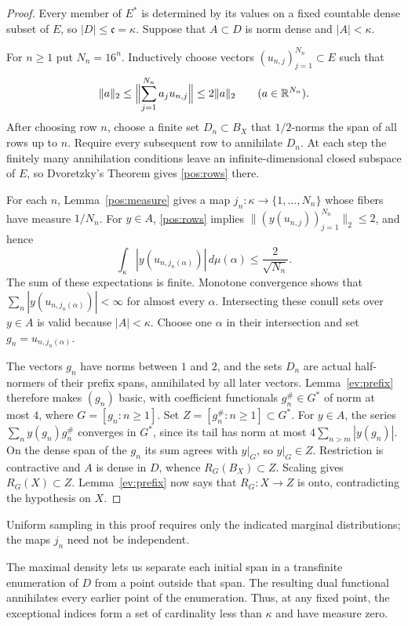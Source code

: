 \begin{proof}
Every member of $E^*$ is determined by its values on a fixed countable
dense subset of $E$, so $|D|\le\mathfrak c=\kappa$.  Suppose that $A\subset D$
is norm dense and $|A|<\kappa$.

For $n\ge1$ put $N_n=16^n$.  Inductively choose vectors
$(u_{n,j})_{j=1}^{N_n}\subset E$ such that
\begin{equation}\label{pos:rows}
 \|a\|_2\le\Bigl\|\sum_{j=1}^{N_n}a_j u_{n,j}\Bigr\|
       \le2\|a\|_2\qquad(a\in\mathbb R^{N_n}).
\end{equation}
After choosing row $n$, choose a finite set $D_n\subset B_X$ that
$1/2$-norms the span of all rows up to $n$.  Require every subsequent row
to annihilate $D_n$.  At each step the finitely many annihilation conditions
leave an infinite-dimensional closed subspace of $E$, so Dvoretzky's
Theorem gives \eqref{pos:rows} there.

For each $n$, Lemma~\ref{pos:measure} gives a map
$j_n:\kappa\to\{1,\ldots,N_n\}$ whose fibers have measure $1/N_n$.
For $y\in A$, \eqref{pos:rows} implies
$\|(y(u_{n,j}))_{j=1}^{N_n}\|_2\le2$, and hence
\[
 \int_\kappa |y(u_{n,j_n(\alpha)})|\,d\mu(\alpha)
 \le \frac2{\sqrt{N_n}}.
\]
The sum of these expectations is finite.  Monotone convergence shows that
$\sum_n|y(u_{n,j_n(\alpha)})|<\infty$ for almost every $\alpha$.
Intersecting these conull sets over $y\in A$ is valid because $|A|<\kappa$.
Choose one $\alpha$ in their intersection and set $g_n=u_{n,j_n(\alpha)}$.

The vectors $g_n$ have norms between $1$ and $2$, and the sets $D_n$ are
actual half-normers of their prefix spans, annihilated by all later vectors.
Lemma~\ref{ev:prefix} therefore makes $(g_n)$ basic, with coefficient
functionals $g_n^\#\in G^*$ of norm at most $4$, where
$G=[g_n:n\ge1]$.  Set $Z=[g_n^\#:n\ge1]\subset G^*$.
For $y\in A$, the series
$\sum_n y(g_n)g_n^\#$ converges in $G^*$, since its tail has norm at most
$4\sum_{n>m}|y(g_n)|$.  On the dense span of the $g_n$ its sum agrees with
$y|_G$, so $y|_G\in Z$.  Restriction is contractive and $A$ is dense in
$D$, whence $R_G(B_X)\subset Z$.  Scaling gives $R_G(X)\subset Z$.
Lemma~\ref{ev:prefix} now says that $R_G:X\to Z$ is onto, contradicting
the hypothesis on $X$.
\end{proof}

Uniform sampling in this proof requires only the indicated marginal
distributions; the maps $j_n$ need not be independent.

The maximal density lets us separate each initial span in a transfinite
enumeration of $D$ from a point outside that span. The resulting dual
functional annihilates every earlier point of the enumeration. Thus, at
any fixed point, the exceptional indices form a set of cardinality less
than $\kappa$ and have measure zero.

